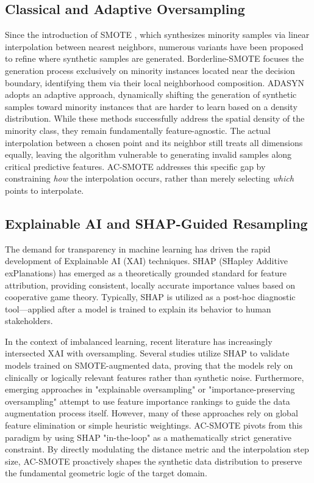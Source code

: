 \documentclass[conference,a4paper]{IEEEtran}
\begin{document}
\subsection{Classical and Adaptive Oversampling}
Since the introduction of SMOTE \cite{chawla2002smote}, which synthesizes minority samples via linear interpolation between nearest neighbors, numerous variants have been proposed to refine where synthetic samples are generated. Borderline-SMOTE \cite{han2005borderline} focuses the generation process exclusively on minority instances located near the decision boundary, identifying them via their local neighborhood composition. ADASYN \cite{he2008adasyn} adopts an adaptive approach, dynamically shifting the generation of synthetic samples toward minority instances that are harder to learn based on a density distribution. While these methods successfully address the spatial density of the minority class, they remain fundamentally feature-agnostic. The actual interpolation between a chosen point and its neighbor still treats all dimensions equally, leaving the algorithm vulnerable to generating invalid samples along critical predictive features. AC-SMOTE addresses this specific gap by constraining \textit{how} the interpolation occurs, rather than merely selecting \textit{which} points to interpolate.

\subsection{Explainable AI and SHAP-Guided Resampling}
The demand for transparency in machine learning has driven the rapid development of Explainable AI (XAI) techniques. SHAP (SHapley Additive exPlanations) \cite{lundberg2017unified} has emerged as a theoretically grounded standard for feature attribution, providing consistent, locally accurate importance values based on cooperative game theory. Typically, SHAP is utilized as a post-hoc diagnostic tool---applied after a model is trained to explain its behavior to human stakeholders. 

In the context of imbalanced learning, recent literature has increasingly intersected XAI with oversampling. Several studies utilize SHAP to validate models trained on SMOTE-augmented data, proving that the models rely on clinically or logically relevant features rather than synthetic noise. Furthermore, emerging approaches in "explainable oversampling" or "importance-preserving oversampling" attempt to use feature importance rankings to guide the data augmentation process itself. However, many of these approaches rely on global feature elimination or simple heuristic weightings. AC-SMOTE pivots from this paradigm by using SHAP "in-the-loop" as a mathematically strict generative constraint. By directly modulating the distance metric and the interpolation step size, AC-SMOTE proactively shapes the synthetic data distribution to preserve the fundamental geometric logic of the target domain.
\end{document}
